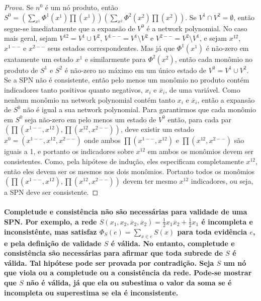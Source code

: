 \documentclass[a4paper,10pt]{article}
\theoremstyle{plain}
\begin{document}
\begin{proof}[Prova]
  Se $n^0$ é um nó produto, então $S^0=(\sum_{x^1}\Phi^1(x^1)\prod(x^1))(\sum_{x^2}\Phi^2(x^2)\prod
  (x^2))$. Se $V^1 \cap V^2 = \emptyset$, então segue-se imediatamente que a expansão de $V^0$ é a
  network polynomial. No caso mais geral, sejam $V^{12}=V^1 \cup V^2$, $V^{1--}=V^1 \setminus V^2$
  e $V^{2--}=V^2 \setminus V^1$, e sejam $x^{12}$, $x^{1--}$ e $x^{2--}$ seus estados
  correspondentes. Mas já que $\Phi^1(x^1)$ é não-zero em exatamente um estado $x^1$ e similarmente
  para $\Phi^2(x^2)$, então cada monômio no produto de $S^1$ e $S^2$ é não-zero no máximo em um
  único estado de $V^0 = V^1 \cup V^2$. Se a SPN não é consistente, então pelo menos um monômio no
  produto contém indicadores tanto positivos quanto negativos, $x_i$ e $\overline{x}_i$, de uma
  variável. Como nenhum monômio na network polynomial contém tanto $x_i$ e $\overline{x}_i$, então
  a expansão de $S^0$ não é igual a sua network polynomial. Para garantirmos que cada monômio em
  $S^0$ seja não-zero em pelo menos um estado de $V^0$ então, para cada par $(\prod(x^{1--},
  x^{12}), \prod(x^{12}, x^{2--}))$, deve existir um estado $x^0=(x^{1--},x^{12},x^{2--})$ onde
  ambos $\prod(x^{1--},x^{12})$ e $\prod(x^{12},x^{2--})$ são iguais a 1, e portanto os indicadores
  sobre $x^12$ em ambos os monômios devem ser consistentes. Como, pela hipótese de indução, eles
  especificam completamente $x^{12}$, então eles devem ser os mesmos nos dois monômios. Portanto
  todos os monômios $(\prod(x^{1--},x^{12}), \prod(x^{12},x^{2--}))$ devem ter mesmo $x^{12}$
  indicadores, ou seja, a SPN deve ser consistente.
\end{proof}

\paragraph{
  Completude e consistência não são necessárias para validade de uma SPN. Por exemplo, a rede
  $S(x_1,x_2,\overline{x}_2,\overline{x}_2) = \frac{1}{2}x_1\overline{x}_2 + \frac{1}{2}x_1$ é
  incompleta e inconsistênte, mas satisfaz $\Phi_S(e) = \sum_{x \in e} S(x)$ para toda evidência
  $e$, e pela definição de validade $S$ é válida. No entanto, completude e consistência são
  necessárias para afirmar que toda subrede de $S$ é válida. Tal hipótese pode ser provada por
  contradição. Seja $S$ um nó que viola ou a completude ou a consistência da rede. Pode-se mostrar
  que $S$ não é válida, já que ela ou subestima o valor da soma se é incompleta ou superestima se
  ela é inconsistente.
}

\newpage

\printbibliography
\end{document}
